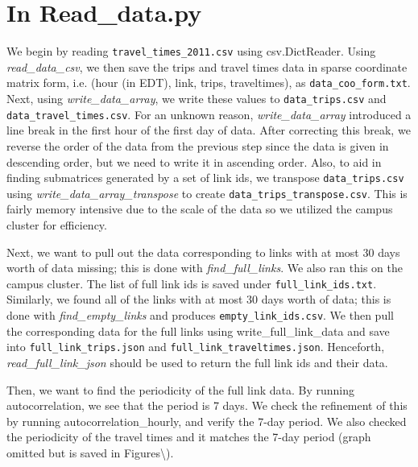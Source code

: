 \documentclass[12pt,letterpaper]{article}
\begin{document}
\section{In Read\_data.py}
We begin by reading \texttt{travel\_times\_2011.csv} using csv.DictReader. 
Using \\\textsl{read\_data\_csv}, we then save the trips and travel times data in sparse coordinate matrix form, i.e. (hour (in EDT), link, trips, traveltimes), as \texttt{data\_coo\_form.txt}. 
Next, using \textsl{write\_data\_array},  we write these values to \texttt{data\_trips.csv} and \texttt{data\_travel\_times.csv}. 
For an unknown reason, \textsl{write\_data\_array} introduced a line break in the first hour of the first day of data.
After correcting this break, we reverse the order of the data from the previous step since the data is given in descending order, but we need to write it in ascending order.
Also, to aid in finding submatrices generated by a set of link ids, we transpose \texttt{data\_trips.csv} using \textsl{write\_data\_array\_transpose} to create \texttt{data\_trips\_transpose.csv}.
This is fairly memory intensive due to the scale of the data so we utilized the campus cluster for efficiency. 


Next, we want to pull out the data corresponding to links with at most 30 days worth of data missing; this is done with \textsl{find\_full\_links}. 
We also ran this on the campus cluster.
The list of full link ids is saved under \texttt{full\_link\_ids.txt}.
Similarly, we found all of the links with at most 30 days worth of data; this is done with \textsl{find\_empty\_links} and produces \texttt{empty\_link\_ids.csv}.
We then pull the corresponding data for the full links using write\_full\_link\_data and save into \texttt{full\_link\_trips.json} and \texttt{full\_link\_traveltimes.json}.
Henceforth, \textsl{read\_full\_link\_json} should be used to return the full link ids and their data.

Then, we want to find the periodicity of the full link data. 
By running autocorrelation, we see that the period is 7 days. 
We check the refinement of this by running autocorrelation\_hourly, and verify the 7-day period.
We also checked the periodicity of the travel times and it matches the 7-day period (graph omitted but is saved in Figures\textbackslash).
\end{document}
